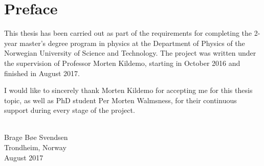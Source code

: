 \section*{\Huge Preface}

This thesis has been carried out as part of the requirements for completing the 2-year master's degree program in physics at the Department of Physics of the Norwegian University of Science and Technology. The project was written under the supervision of Professor Morten Kildemo, starting in October 2016 and finished in August 2017.

I would like to sincerely thank Morten Kildemo for accepting me for this thesis topic, as well as PhD student Per Morten Walmsness, for their continuous support during every stage of the project.
\\
\\
\begin{minipage}{0.95\textwidth}
\begin{flushright}
Brage Bøe Svendsen \\
Trondheim, Norway \\
August 2017
\end{flushright}
\end{minipage}\\[4cm]



\clearpage